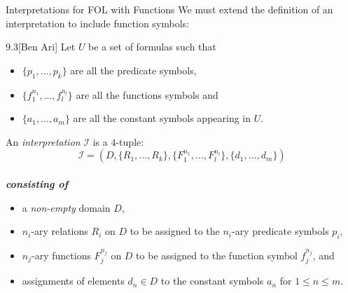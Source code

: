 \documentclass[style=sailor,size=12pt]{powerdot}
\begin{document}
\begin{wideslide}[bm=,toc=]{Interpretations for FOL with Functions}
We must extend the definition of an interpretation to include function symbols:
\pause
\begin{defn}{9.3}[Ben Ari]
Let $U$ be a set of formulas such that 
\begin{itemize}
\item<3-> $\{p_1,...,p_k\}$ are all the predicate symbols, 
\item<4-> $\{f_1^{n_1},...,f_l^{n_l}\}$ are all the functions symbols and
\item<5-> $\{a_1,...,a_m\}$ are all the constant symbols appearing in $U$. 
\end{itemize}
\pause[4]
An \emph{interpretation} $\mathcal{I}$ is a $4$-tuple:
\vspace{-2mm}
\[
  \mathcal{I} = (D, \{R_1,...,R_k\}, \{F_1^{n_1},...,F_l^{n_l}\},\{d_1,...,d_m\})
  \]~\\
\vspace{-8mm}
\pause
\textbf{\emph{consisting of}}
\begin{itemize}
\item<8-> a \emph{non-empty} domain $D$,
\item<9-> $n_i$-ary relations $R_i$ on $D$ to be assigned to the $n_i$-ary predicate symbols $p_i$, 
\item<10-> $n_j$-ary functions $F_j^{n_j}$ on $D$ to be assigned to the function symbol $f_j^{n_j}$, and 
\item<11-> assignments of elements $d_n \in D$ to the constant symbols $a_n$ for $1 \leq n \leq m$.
\end{itemize}
\end{defn}
\end{wideslide}
\end{document}
